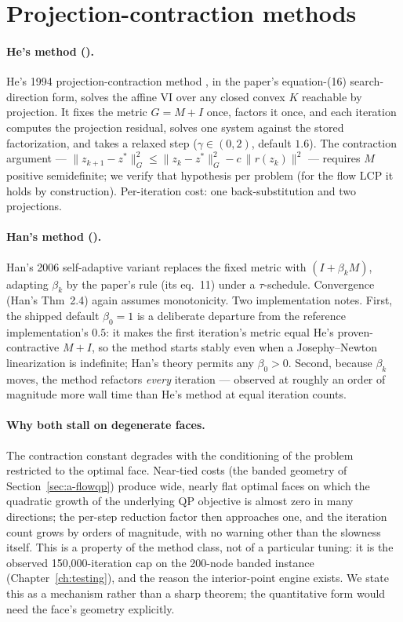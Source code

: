 \section{Projection-contraction methods}
\label{sec:a-pc}

\paragraph{He's method ().} He's 1994 projection-contraction
method \cite{he1994}, in the paper's equation-(16) search-direction form,
solves the affine VI over any closed convex $K$ reachable by projection. It
fixes the metric $G = M + I$ once, factors it once, and each iteration
computes the projection residual, solves one system against the stored
factorization, and takes a relaxed step ($\gamma \in (0,2)$, default $1.6$).
The contraction argument --- $\|z_{k+1} - z^\ast\|_G^2 \le
\|z_k - z^\ast\|_G^2 - c\,\|r(z_k)\|^2$ --- requires $M$ positive
semidefinite; we verify that hypothesis per problem (for the flow LCP it
holds by construction). Per-iteration cost: one back-substitution and two
projections.

\paragraph{Han's method ().} Han's 2006 self-adaptive variant
\cite{han2006} replaces the fixed metric with $(I + \beta_k M)$, adapting
$\beta_k$ by the paper's rule (its eq.~11) under a $\tau$-schedule.
Convergence (Han's Thm~2.4) again assumes monotonicity. Two implementation
notes. First, the shipped default $\beta_0 = 1$ is a deliberate departure
from the reference implementation's $0.5$: it makes the first iteration's
metric equal He's proven-contractive $M + I$, so the method starts stably
even when a Josephy--Newton linearization is indefinite; Han's theory
permits any $\beta_0 > 0$. Second, because $\beta_k$ moves, the method
refactors \emph{every} iteration --- observed at roughly an order of
magnitude more wall time than He's method at equal iteration counts.

\paragraph{Why both stall on degenerate faces.} The contraction constant
degrades with the conditioning of the problem restricted to the optimal
face. Near-tied costs (the banded geometry of
Section~\ref{sec:a-flowqp}) produce wide, nearly flat optimal faces on
which the quadratic growth of the underlying QP objective is almost zero in
many directions; the per-step reduction factor then approaches one, and the
iteration count grows by orders of magnitude, with no warning other than
the slowness itself. This is a property of the method class, not of a
particular tuning: it is the observed 150{,}000-iteration cap on the
200-node banded instance (Chapter~\ref{ch:testing}), and the reason the
interior-point engine exists. We state this as a mechanism rather than a
sharp theorem; the quantitative form would need the face's geometry
explicitly.

